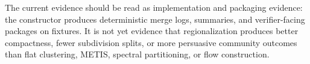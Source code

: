 The current evidence should be read as implementation and packaging evidence:
the constructor produces deterministic merge logs, summaries, and verifier-facing
packages on fixtures. It is not yet evidence that regionalization produces
better compactness, fewer subdivision splits, or more persuasive community
outcomes than flat clustering, METIS, spectral partitioning, or flow
construction.
